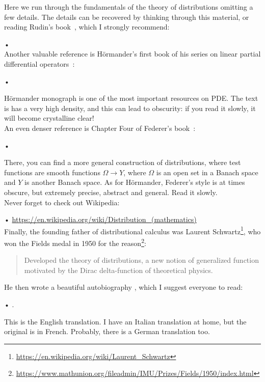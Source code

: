 \documentclass[a4paper,9pt]{amsart}
\theoremstyle{plain}
\theoremstyle{definition}
\theoremstyle{remark}
\begin{document}
Here we run through the fundamentals of the theory of distributions omitting a few details.
The details can be recovered by thinking through this material, or reading Rudin's book~\cite{MR1157815}, which I strongly recommend:

• \\

Another valuable reference is Hörmander's first book of his series on linear partial differential operators~\cite{MR717035}:

• 

Hörmander monograph is one of the most important resources on PDE.
The text is has a very high density, and this can lead to obscurity: if you read it slowly, it will become crystalline clear!\\

An even denser reference is Chapter Four of Federer's book~\cite{MR0257325}:

• 

There, you can find a more general construction of distributions, where test functions are smooth functions $\Omega\to Y$, where $\Omega$ is an open set in a Banach space and $Y$ is another Banach space. 
As for Hörmander, Federer's style is at times obscure, but extremely precise, abstract and general.
Read it slowly.\\

Never forget to check out Wikipedia:

• \url{https://en.wikipedia.org/wiki/Distribution_(mathematics)}\\

Finally, the founding father of distributional calculus was Laurent Schwartz\footnote{\url{https://en.wikipedia.org/wiki/Laurent_Schwartz}}, who won the Fields medal in 1950 for the reason\footnote{\url{https://www.mathunion.org/fileadmin/IMU/Prizes/Fields/1950/index.html}}:
\begin{quotation}
	Developed the theory of distributions, a new notion of generalized function motivated by the Dirac delta-function of theoretical physics.
\end{quotation}
He then wrote a beautiful autobiography \cite{zbMATH01571670}, which I suggest everyone to read:

• .

This is the English translation. I have an Italian translation at home, but the original is in French. Probably, there is a German translation too.
\end{document}

